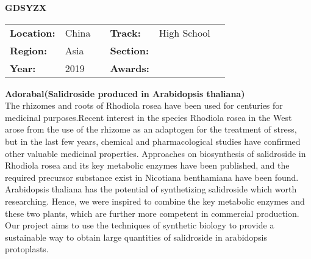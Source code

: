 \textbf{\uppercase{GDSYZX}}
\FloatBarrier
\begin{table}[h]
\begin{tabular}{lp{2.5cm}llll}
\textbf{Location:} & China & \multicolumn{1}{|l}{} & \textbf{Track:}   & High School \\
\textbf{Region:}   & Asia   & \multicolumn{1}{|l}{} & \textbf{Section:} &  \\
\textbf{Year:}     & 2019   & \multicolumn{1}{|l}{} & \textbf{Awards:}  &
\end{tabular}
\end{table}
\FloatBarrier
\noindent	\textbf{Adorabal(Salidroside produced in  Arabidopsis thaliana)} \vspace{.2cm}\\
The rhizomes and roots of Rhodiola rosea have been used for centuries for medicinal purposes.Recent interest in the species Rhodiola rosea in the West arose from the use of the rhizome as an adaptogen for the treatment of stress, but in the last few years, chemical and pharmacological studies have confirmed other valuable medicinal properties.
Approaches on biosynthesis of salidroside in Rhodiola rosea and its key metabolic enzymes have been published, and the required precursor substance exist in Nicotiana benthamiana have been found. Arabidopsis thaliana has the potential of synthetizing salidroside which worth researching.
Hence, we were inspired to combine the key metabolic enzymes and these two plants, which are further more competent in commercial production.
Our project aims to use the techniques of synthetic biology to provide a sustainable way to obtain large quantities of salidroside in arabidopsis protoplasts.
\vspace{2cm}

